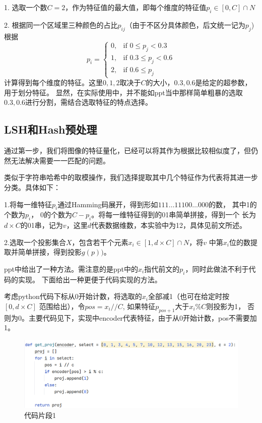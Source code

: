 \documentclass{article}
\begin{document}
    1. 选取一个数\(C = 2\)，作为特征值的最大值，即每个维度的特征值\(p_i \in [0, C] \cap N\)

    2. 根据同一个区域里三种颜色的占比\(p_{ij}\)（由于不区分具体颜色，后文统一记为\(p_j\))
    根据\[
p_i =
\begin{cases}
0, & \text{if } 0 \leq p_j < 0.3 \\
1, & \text{if } 0.3 \leq p_j < 0.6 \\
2, & \text{if } 0.6 \leq p_j
\end{cases}
\]
    计算得到每个维度的特征。这里\(0,1,2\)取决于\(C\)的大小，\(0.3, 0.6\)是给定的超参数，用于划分特征。
    显然，在实际使用中，并不能如ppt当中那样简单粗暴的选取\(0.3, 0.6\)进行分割，需结合选取特征的特点选择。

\subsection{LSH和Hash预处理}

    通过第一步，我们将图像的特征量化，已经可以将其作为根据比较相似度了，但仍然无法解决需要一一匹配的问题。

    类似于字符串哈希中的取模操作，我们选择提取其中几个特征作为代表将其进一步分类。具体如下：

    1.将每一维特征\(p_i\)通过Hamming码展开，得到形如\(111\ldots11100\ldots000\)的数，
    其中1的个数为\(p_i\)， 0的个数为\(C - p_i\)。将每一维特征得到的01串简单拼接，得到一个
    长为\(d \times C\)的01串，记为\(v\)，这里\(d\)代表数据维数，本实验中为12，具体见前文所述。

    2.选取一个投影集合\(X\)，包含若干个元素\(x_i \in [1, d \times C] \cap N\)，将\(v\)
    中第\(x_i\)位的数提取并简单拼接，得到投影\(g(p))\)。

    ppt中给出了一种方法。需注意的是ppt中的\(x_i\)指代前文的\(p_i\)，同时此做法不利于代码的实现。
    下面给出一种更便于代码实现的方法。

    考虑python代码下标从0开始计数，将选取的\(x_i\)全部减1（也可在给定时按\([0, d \times C]\)
    范围给出），令\(pos = x_i // C\), 如果特征\(p_{pos + 1}\)大于\(x_i \% C\)则投影为1，
    否则为0。主要代码见下，实现中encoder代表特征，由于从0开始计数，pos不需要加1。

\begin{figure}[h]
\centering
\includegraphics[width=1\textwidth]{./prog_part/1}
\caption{代码片段1}
\end{figure}
\end{document}
